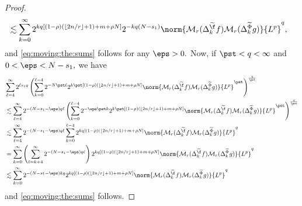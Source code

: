 \begin{proof}
\begin{align*}
& \lesssim \sum\limits_{k=0}^\infty  2^{k q [(1-\rho)( \lfloor{2n/r}\rfloor + 1) + m+\rho N]} 2^{-kq(N-s_1)}   \norm{\mathcal{M}_r(\Delta^{\widetilde{\f}}_k f)\mathcal{M}_r(\Delta^{\widetilde{\Phi}}_k g)}{L^p}^q,
\end{align*}
and \eqref{eq:moving:the:sums} follows for any $\eps>0.$ Now, if $\pst<q <\infty$ and $0<\eps < N - s_1,$ we have
\begin{align*}
& \sum\limits_{\ell=4}^\infty   2^{\ell  s_1 q} \left(  \sum\limits_{k=0}^{\ell -4} 2^{- N \pst \ell} 2^{k \pst [(1-\rho)( \lfloor{2n/r}\rfloor + 1) +m+\rho N]}   \norm{\mathcal{M}_r(\Delta^{\widetilde{\f}}_k f)\mathcal{M}_r(\Delta^{\widetilde{\Phi}}_k g)}{L^p}^{\pst}\right)^\frac{q}{\pst} \\
& \lesssim \sum\limits_{\ell=4}^\infty 2^{-  (N- s_1 - \eps) q \ell}  \left(  \sum\limits_{k=0}^{\ell -4} 2^{-\eps \pst k} 2^{k \pst [(1-\rho)( \lfloor{2n/r}\rfloor + 1) + m+\rho N]}   \norm{\mathcal{M}_r(\Delta^{\widetilde{\f}}_k f)\mathcal{M}_r(\Delta^{\widetilde{\Phi}}_k g)}{L^p}^{\pst}\right)^\frac{q}{\pst}\\
& \lesssim  \sum\limits_{\ell=4}^\infty 2^{-  (N- s_1 - \eps) q \ell} \sum\limits_{k=0}^{\ell -4} 2^{k q [(1-\rho)( \lfloor{2n/r}\rfloor + 1) + m+\rho N]}   \norm{\mathcal{M}_r(\Delta^{\widetilde{\f}}_k f)\mathcal{M}_r(\Delta^{\widetilde{\Phi}}_k g)}{L^p}^q \\
& =  \sum\limits_{k=0}^\infty \left( \sum\limits_{\ell=k+4}^{\infty} 2^{- (N- s_1 - \eps) q \ell} \right) 2^{k q [(1-\rho)( \lfloor{2n/r}\rfloor + 1) + m+\rho N]}   \norm{\mathcal{M}_r(\Delta^{\widetilde{\f}}_k f)\mathcal{M}_r(\Delta^{\widetilde{\Phi}}_k g)}{L^p}^q \\
& \lesssim \sum\limits_{k=0}^\infty  2^{- (N- s_1 - \eps) kq } 2^{k q [(1-\rho)( \lfloor{2n/r}\rfloor + 1) + m+\rho N]}   \norm{\mathcal{M}_r(\Delta^{\widetilde{\f}}_k f)\mathcal{M}_r(\Delta^{\widetilde{\Phi}}_k g)}{L^p}^q 
\end{align*}
and \eqref{eq:moving:the:sums} follows.


\end{proof}

